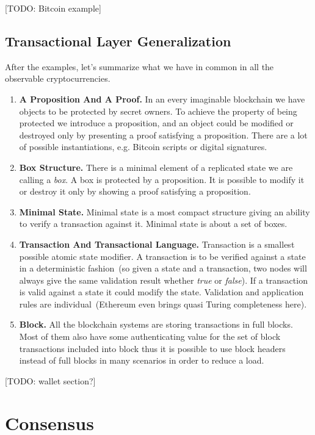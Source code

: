 \documentclass[]{report}   %
\begin{document}
[TODO: Bitcoin example]

\subsection{Transactional Layer Generalization}

After the examples, let's summarize what we have in common in all the observable cryptocurrencies.

\begin{enumerate}
\item{\textbf{A Proposition And A Proof.}}
In an every imaginable blockchain we have objects to be protected by secret owners. To achieve the property of being protected we introduce a proposition, and an object could be modified or destroyed only by presenting a proof satisfying a proposition. There are a lot of possible instantiations, e.g. Bitcoin scripts or digital signatures. 
\item{\textbf{Box Structure.}}
There is a minimal element of a replicated state we are calling a \textit{box}. A box is protected by a proposition. It is possible to modify it or destroy it only by showing a proof satisfying a proposition. 
\item{\textbf{Minimal State.}}
Minimal state is a most compact structure giving an ability to verify a transaction against it. Minimal state is about a set of boxes. 
\item{\textbf{Transaction And Transactional Language.}}
Transaction is a smallest possible atomic state modifier. A transaction is to be verified against a state in a deterministic fashion~(so given a state and a transaction, two nodes will always give the same validation result whether \textit{true} or \textit{false}). If a transaction is valid against a state it could modify the state. Validation and application rules are individual~(Ethereum even brings quasi Turing completeness here).
\item{\textbf{Block.}}
All the blockchain systems are storing transactions in full blocks. Most of them also have some authenticating value for the set of block transactions included into block thus it is possible to use block headers instead of full blocks in many scenarios in order to reduce a load.
\end{enumerate}


[TODO: wallet section?]

\section{Consensus}
\end{document}
